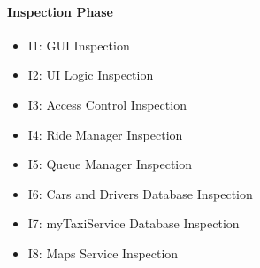 \paragraph{Inspection Phase}
\begin{itemize}
\item I1: GUI Inspection
\item I2: UI Logic Inspection 
\item I3: Access Control Inspection
\item I4: Ride Manager Inspection
\item I5: Queue Manager Inspection
\item I6: Cars and Drivers Database Inspection
\item I7: myTaxiService Database Inspection
\item I8: Maps Service Inspection
\end{itemize}

